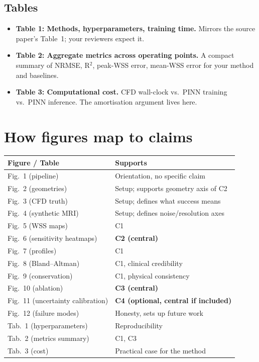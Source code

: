 \documentclass[11pt]{article}
\begin{document}
\subsection*{Tables}
\begin{itemize}[noitemsep]
\item \textbf{Table 1: Methods, hyperparameters, training time.} Mirrors the source paper's Table~1; your reviewers expect it.
\item \textbf{Table 2: Aggregate metrics across operating points.} A compact summary of NRMSE, R$^2$, peak-WSS error, mean-WSS error for your method and baselines.
\item \textbf{Table 3: Computational cost.} CFD wall-clock vs.\ PINN training vs.\ PINN inference. The amortisation argument lives here.
\end{itemize}

\section{How figures map to claims}
\begin{tabularx}{\textwidth}{l X}
\toprule
\textbf{Figure / Table} & \textbf{Supports} \\
\midrule
Fig.\ 1 (pipeline) & Orientation, no specific claim \\
Fig.\ 2 (geometries) & Setup; supports geometry axis of C2 \\
Fig.\ 3 (CFD truth) & Setup; defines what success means \\
Fig.\ 4 (synthetic MRI) & Setup; defines noise/resolution axes \\
Fig.\ 5 (WSS maps) & C1 \\
Fig.\ 6 (sensitivity heatmaps) & \textbf{C2 (central)} \\
Fig.\ 7 (profiles) & C1 \\
Fig.\ 8 (Bland--Altman) & C1, clinical credibility \\
Fig.\ 9 (conservation) & C1, physical consistency \\
Fig.\ 10 (ablation) & \textbf{C3 (central)} \\
Fig.\ 11 (uncertainty calibration) & \textbf{C4 (optional, central if included)} \\
Fig.\ 12 (failure modes) & Honesty, sets up future work \\
Tab.\ 1 (hyperparameters) & Reproducibility \\
Tab.\ 2 (metrics summary) & C1, C3 \\
Tab.\ 3 (cost) & Practical case for the method \\
\bottomrule
\end{tabularx}
\end{document}
